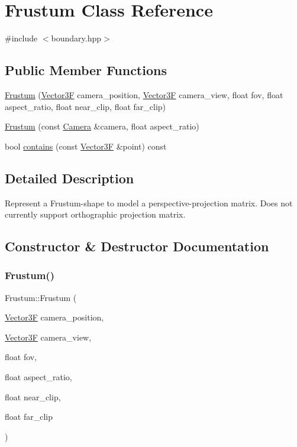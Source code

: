 \hypertarget{class_frustum}{}\section{Frustum Class Reference}
\label{class_frustum}


{\ttfamily \#include $<$boundary.\+hpp$>$}

\subsection*{Public Member Functions}
\begin{DoxyCompactItemize}
\item 
\mbox{\hyperlink{class_frustum_ac79d027bdeb3a365e360b41280813aca}{Frustum}} (\mbox{\hyperlink{class_vector3}{Vector3F}} camera\+\_\+position, \mbox{\hyperlink{class_vector3}{Vector3F}} camera\+\_\+view, float fov, float aspect\+\_\+ratio, float near\+\_\+clip, float far\+\_\+clip)
\item 
\mbox{\hyperlink{class_frustum_a5ac3dd6a67b1a705570bbb113aa8b923}{Frustum}} (const \mbox{\hyperlink{class_camera}{Camera}} \&camera, float aspect\+\_\+ratio)
\item 
bool \mbox{\hyperlink{class_frustum_a446362a4ddf7de9775eb13be131ec228}{contains}} (const \mbox{\hyperlink{class_vector3}{Vector3F}} \&point) const
\end{DoxyCompactItemize}


\subsection{Detailed Description}
Represent a Frustum-\/shape to model a perspective-\/projection matrix. Does not currently support orthographic projection matrix. 

\subsection{Constructor \& Destructor Documentation}
\mbox{\label{class_frustum_ac79d027bdeb3a365e360b41280813aca}} 
\subsubsection{\texorpdfstring{Frustum()}{Frustum()}\hspace{0.1cm}{\footnotesize\ttfamily [1/2]}}
{\footnotesize\ttfamily Frustum\+::\+Frustum (\begin{DoxyParamCaption}\item[{\mbox{\hyperlink{class_vector3}{Vector3F}}}]{camera\+\_\+position,  }\item[{\mbox{\hyperlink{class_vector3}{Vector3F}}}]{camera\+\_\+view,  }\item[{float}]{fov,  }\item[{float}]{aspect\+\_\+ratio,  }\item[{float}]{near\+\_\+clip,  }\item[{float}]{far\+\_\+clip }\end{DoxyParamCaption})}


